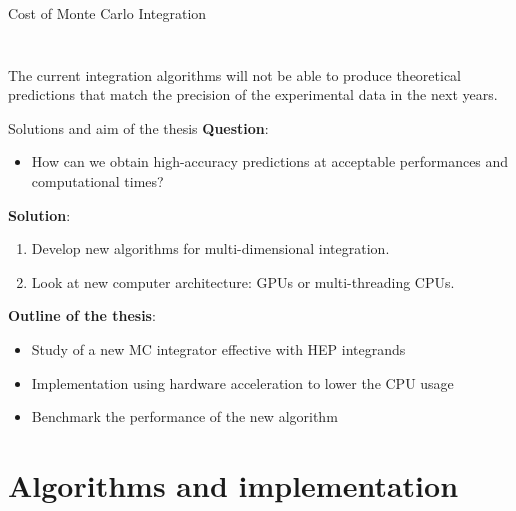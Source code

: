 \documentclass[t,handout,professionalfont,serif]{beamer}
\begin{document}
\begin{frame}{Cost of Monte Carlo Integration}
\begin{columns}
\begin{column}{0.5 \textwidth}
\begin{figure}[h]
		\label{CPU1 cost}
	\end{figure}
\end{column}
\end{columns}
The current integration algorithms  will not be able to produce theoretical predictions that match the precision of the experimental data in the next years.
	\end{frame}

\begin{frame}{Solutions and aim of the thesis}
	\scriptsize
		\textbf{Question}:
		\begin{itemize}
			\item How can we obtain high-accuracy predictions 
			at acceptable performances and computational times?
		\end{itemize}



	
	\vspace{0.5cm}
	\textbf{Solution}:
	\begin{enumerate}
		\item Develop new algorithms for multi-dimensional integration.
		\item Look at new computer architecture: GPUs or multi-threading CPUs. 
	\end{enumerate}
		\vspace{0.5cm}
\textbf{Outline of the thesis}:
\begin{itemize}
	\item Study of  a new MC integrator effective with HEP integrands
	\item Implementation using hardware acceleration to lower the CPU usage
	\item Benchmark the performance of the new algorithm
\end{itemize}
\end{frame}
\section{Algorithms and implementation}
\end{document}
